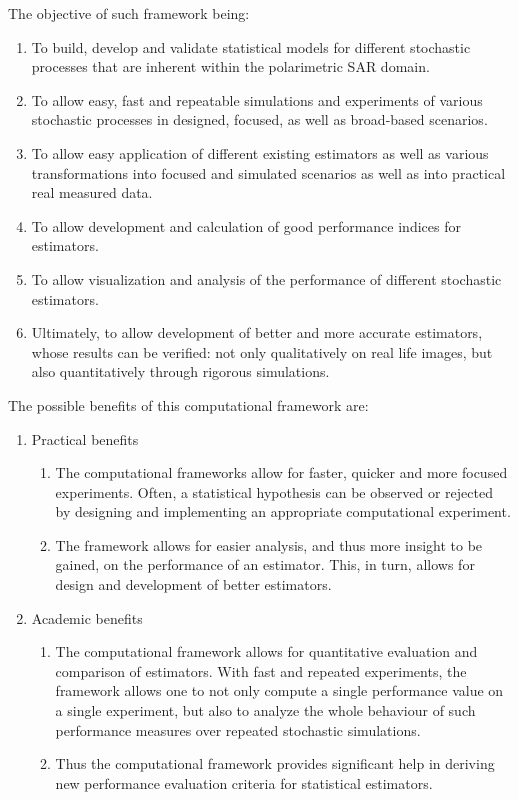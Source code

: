 The objective of such framework being:
\begin{enumerate}
\item To build, develop and validate statistical models for different stochastic processes that are inherent within the polarimetric SAR domain.
\item To allow easy, fast and repeatable simulations and experiments of various stochastic processes in designed, focused, as well as broad-based scenarios.
\item To allow easy application of different existing estimators as well as various transformations into focused and simulated scenarios as well as into practical real measured data.
\item To allow development and calculation of good performance indices for estimators. 
\item To allow visualization and analysis of the performance of different stochastic estimators.
\item Ultimately, to allow development of better and more accurate estimators, whose results can be verified: not only qualitatively on real life images, but also quantitatively through rigorous simulations.
\end{enumerate}

The possible benefits of this computational framework are:
\begin{enumerate}
\item Practical benefits
\begin{enumerate}
\item The computational frameworks allow for faster, quicker and more focused experiments. 
Often, a statistical hypothesis can be observed or rejected by designing and implementing an appropriate computational experiment.
\item The framework allows for easier analysis, and thus more insight to be gained, on the performance of an estimator. 
This, in turn, allows for design and development of better estimators.
\end{enumerate}
\item Academic benefits
\begin{enumerate}
\item The computational framework allows for quantitative evaluation and comparison of estimators.
With fast and repeated experiments, the framework allows one to not only compute a single performance value on a single experiment, but also to analyze the whole behaviour of such performance measures over repeated stochastic simulations.
\item Thus the computational framework provides significant help in deriving new performance evaluation criteria for statistical estimators.
\end{enumerate}
\end{enumerate}

